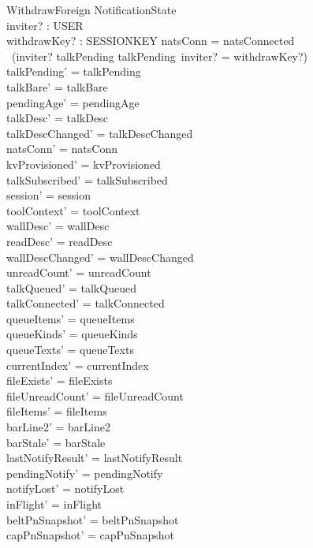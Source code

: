 \documentclass[a4paper,10pt,fleqn]{article}
\begin{document}
\begin{schema}{WithdrawForeign}
  \Delta NotificationState \\
  inviter? : USER \\
  withdrawKey? : SESSIONKEY
  \where
  natsConn = natsConnected \\
  \lnot\, (inviter? \in \dom talkPending \land
  talkPending~inviter? = withdrawKey?) \\
  talkPending' = talkPending \\
  talkBare' = talkBare \\
  pendingAge' = pendingAge \\
  talkDesc' = talkDesc \\
  talkDescChanged' = talkDescChanged \\
  natsConn' = natsConn \\
  kvProvisioned' = kvProvisioned \\
  talkSubscribed' = talkSubscribed \\
  session' = session \\
  toolContext' = toolContext \\
  wallDesc' = wallDesc \\
  readDesc' = readDesc \\
  wallDescChanged' = wallDescChanged \\
  unreadCount' = unreadCount \\
  talkQueued' = talkQueued \\
  talkConnected' = talkConnected \\
  queueItems' = queueItems \\
  queueKinds' = queueKinds \\
  queueTexts' = queueTexts \\
  currentIndex' = currentIndex \\
  fileExists' = fileExists \\
  fileUnreadCount' = fileUnreadCount \\
  fileItems' = fileItems \\
  barLine2' = barLine2 \\
  barStale' = barStale \\
  lastNotifyResult' = lastNotifyResult \\
  pendingNotify' = pendingNotify \\
  notifyLost' = notifyLost \\
  inFlight' = inFlight \\
  beltPnSnapshot' = beltPnSnapshot \\
  capPnSnapshot' = capPnSnapshot \\

\end{schema}
\end{document}
